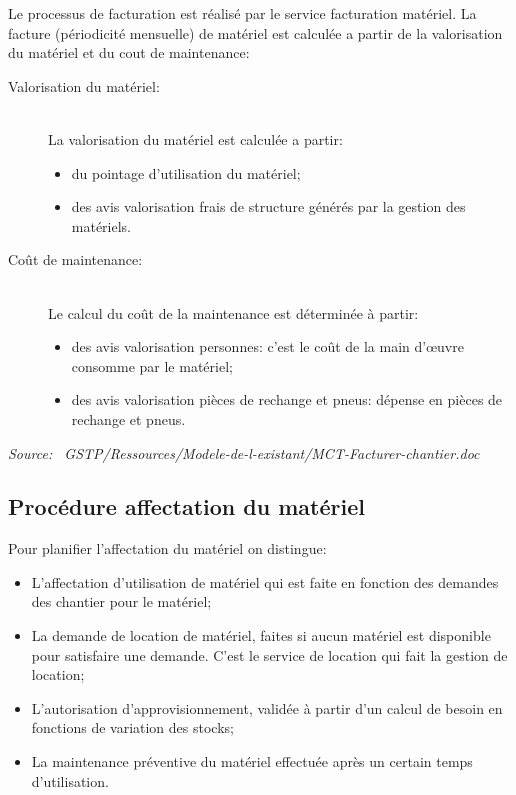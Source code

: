 	Le processus de facturation est réalisé par le service facturation
    matériel. La facture (périodicité mensuelle) de matériel est calculée a
    partir de la valorisation du matériel et du cout de maintenance:

    \begin{description}
	    \item [Valorisation du matériel:]\hfill\\
            La valorisation du matériel est calculée a partir:
		    \begin{itemize}
			    \item du pointage d'utilisation du matériel;
			    \item des avis valorisation frais de structure générés par
                    la gestion des matériels.
		    \end{itemize}	
    
    	\item [Coût de maintenance:]\hfill\\
    		Le calcul du coût de la maintenance est déterminée à partir:
		    \begin{itemize}
			    \item des avis valorisation personnes: c'est le coût de la
                    main d'\oe{}uvre  consomme par le matériel;
			    \item des avis valorisation pièces de rechange et pneus:
                    dépense en pièces de rechange et pneus.
		    \end{itemize}

    \end{description}

    {\sl Source:~{\ttfamily 
        GSTP/Ressources/Modele-de-l-existant/MCT-Facturer-chantier.doc}}

\subsection{Procédure affectation du matériel}

	Pour planifier l'affectation du matériel on distingue:
	\begin{itemize}
		\item L'affectation d'utilisation de matériel qui est faite en
            fonction des demandes des chantier pour le matériel;
		\item La demande de location de matériel, faites si aucun matériel
            est disponible pour satisfaire une demande. C'est le service de
            location qui fait la gestion de location;
		\item L'autorisation d'approvisionnement, validée à partir d'un
            calcul de besoin en fonctions de variation des stocks;
		\item La maintenance préventive du matériel effectuée après un
            certain temps d'utilisation.
	\end{itemize}

